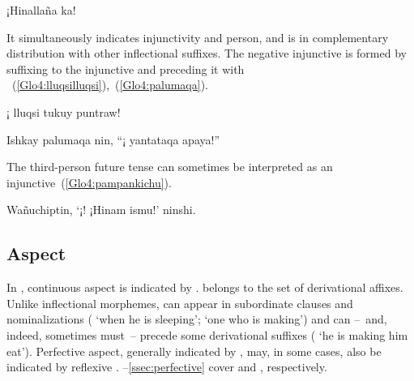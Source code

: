 %
{¡Hinallaña ka!}%
{}%
{}{}%

\noindent
It simultaneously indicates injunctivity and person, and is in complementary distribution with other inflectional suffixes. The negative injunctive is formed by suffixing  to the injunctive and preceding it with ~(\ref{Glo4:lluqsilluqsi}),~(\ref{Glo4:palumaqa}).

%
{¡ lluqsi tukuy puntraw!}%
{}%
{}{}%

%
{Ishkay palumaqa nin, “¡ yantataqa apaya!”}%
{}%
{}{}%

\noindent
The third-person future tense can sometimes be interpreted as an injunctive~(\ref{Glo4:pampankichu}).

%
{Wañuchiptin, ‘¡! ¡Hinam ismu!’ ninshi.}%
{}%
{}{}%

\subsection{Aspect}\label{ssec:aspect}
In \SYQ, continuous aspect is indicated by .  belongs to the set of derivational affixes. Unlike inflectional morphemes,  can appear in subordinate clauses and nominalizations ( ‘when he is sleeping’;  ‘one who is making’) and can --~and, indeed, sometimes must~-- precede some derivational suffixes ( ‘he is making him eat’). Perfective aspect, generally indicated by , may, in some cases, also be indicated by reflexive . --\ref{ssec:perfective} cover  and , respectively.

